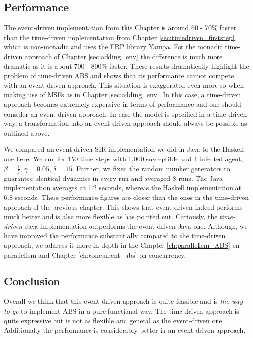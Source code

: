 \subsection{Performance}
\label{sub:eventdriven_performance}
The event-driven implementation from this Chapter is around 60 - 70\% faster than the time-driven implementation from Chapter \ref{sec:timedriven_firststep}, which is non-monadic and uses the FRP library Yampa. For the monadic time-driven approach of Chapter \ref{sec:adding_env} the difference is much more dramatic as it is about 700 - 800\% faster. These results dramatically highlight the problem of time-driven ABS and shows that its performance cannot compete with an event-driven approach. This situation is exaggerated even more so when making use of MSFs as in Chapter \ref{sec:adding_env}. In this case, a time-driven approach becomes extremely expensive in terms of performance and one should consider an event-driven approach. In case the model is specified in a time-driven way, a transformation into an event-driven approach should always be possible as outlined above.

We compared an event-driven SIR implementation we did in Java to the Haskell one here. We run for 150 time steps with 1,000 susceptible and 1 infected agent, $\beta = \frac{1}{5}$, $\gamma = 0.05$, $\delta = 15$. Further, we fixed the random number generators to guarantee identical dynamics in every run and averaged 8 runs. The Java implementation averages at 1.2 seconds, whereas the Haskell implementation at 6.8 seconds. These performance figures are closer than the ones in the time-driven approach of the previous chapter. This shows that event-driven indeed performs much better and is also more flexible as \cite{meyer_event-driven_2014} has pointed out. Curiously, the \textit{time-driven} Java implementation outperforms the event-driven Java one. Although, we have improved the performance substantially compared to the time-driven approach, we address it more in depth in the Chapter \ref{ch:parallelism_ABS} on parallelism and Chapter \ref{ch:concurrent_abs} on concurrency.


\subsection{Conclusion}
Overall we think that this event-driven approach is quite feasible and is \textit{the way to go} to implement ABS in a pure functional way. The time-driven approach is quite expressive but is not as flexible and general as the event-driven one. Additionally the performance is considerably better in an event-driven approach.

